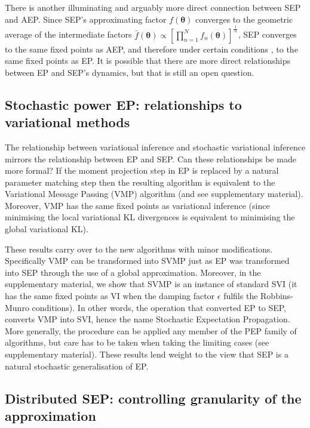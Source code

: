 There is another illuminating and arguably more direct connection between SEP and AEP. Since SEP's approximating factor $f(\bm{\theta})$ converges to the geometric average of the intermediate factors $\bar{f}(\bm{\theta}) \propto [\prod_{n=1}^N f_n(\bm{\theta})]^{\frac{1}{N}}$, SEP converges to the same fixed points as AEP, and therefore under certain conditions \cite{barthelme:aep}, to the same fixed points as EP. %
%
It is possible that there are more direct relationships between EP and SEP's dynamics, but that is still an open question.



\subsection{Stochastic power EP: relationships to variational methods}
%
The relationship between variational inference and stochastic variational inference \cite{hoffman:svi} mirrors the relationship between EP and SEP. 
%
Can these relationships be made more formal? If the moment projection step in EP is replaced by a natural parameter matching step then the resulting algorithm is equivalent to the Variational Message Passing (VMP) algorithm \cite{minka:divergence} (and see supplementary material). Moreover, VMP has the same fixed points as variational inference \cite{winn:vmp} (since minimising the local variational KL divergences is equivalent to minimising the global variational KL). 


These results carry over to the new algorithms with minor modifications. Specifically VMP can be transformed into SVMP just as EP was transformed into SEP through the use of a global approximation. Moreover, in the supplementary material, we show that SVMP is an instance of standard SVI (it has the same fixed points as VI when the damping factor $\epsilon$ fulfils the Robbins-Munro conditions). In other words, the operation that converted EP to SEP, converts VMP into SVI, hence the name Stochastic Expectation Propagation.
%
More generally, the procedure can be applied any member of the PEP family of algorithms, but care has to be taken when taking the limiting cases (see supplementary material).
%
These results lend weight to the view that SEP is a natural stochastic generalisation of EP.


\subsection{Distributed SEP: controlling granularity of the approximation}

